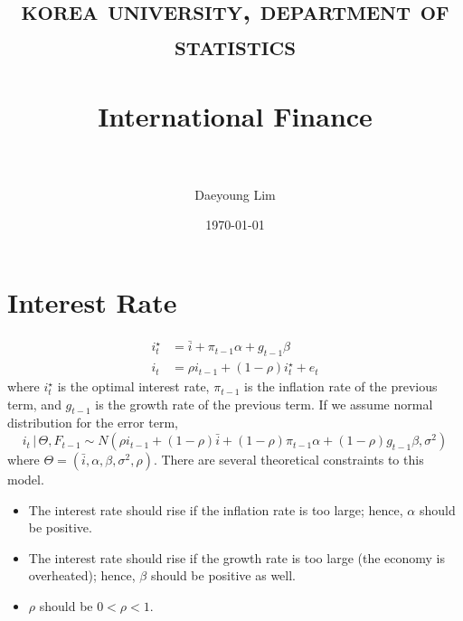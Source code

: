 \documentclass{article}
\title{ 
\normalfont \normalsize 
\textsc{korea university, department of statistics} \\ [25pt] %
\horrule{0.5pt} \\[0.4cm] %
\huge International Finance \\ %
\horrule{2pt} \\[0.5cm] %
}
\author{Daeyoung Lim} %
\date{\normalsize\today} %
\numberwithin{equation}{section} %
\numberwithin{figure}{section} %
\numberwithin{table}{section} %
\begin{document}
\maketitle
\section{Interest Rate}
\begin{equation}
  \begin{split}
    i_{t}^{\star} &= \bar{i} + \pi_{t-1}\alpha + g_{t-1}\beta\\
    i_{t} &= \rho i_{t-1}+(1-\rho)i_{t}^{\star}+e_{t}
  \end{split}
\end{equation}
where $i_{t}^{\star}$ is the optimal interest rate, $\pi_{t-1}$ is the inflation rate of the previous term, and $g_{t-1}$ is the growth rate of the previous term. If we assume normal distribution for the error term,
\begin{equation}
  i_{t}\,|\,\Theta, F_{t-1} \sim N\left(\rho i_{t-1}+(1-\rho)\bar{i}+(1-\rho)\pi_{t-1}\alpha + (1-\rho)g_{t-1}\beta,\sigma^{2}\right)
\end{equation}
where $\Theta = (\bar{i},\alpha,\beta,\sigma^{2},\rho)$. There are several theoretical constraints to this model.
\begin{itemize}
  \item The interest rate should rise if the inflation rate is too large; hence, $\alpha$ should be positive.
  \item The interest rate should rise if the growth rate is too large (the economy is overheated); hence, $\beta$ should be positive as well.
  \item $\rho$ should be $0<\rho<1$.
\end{itemize}
\newpage
\nocite{*}


\end{document}

